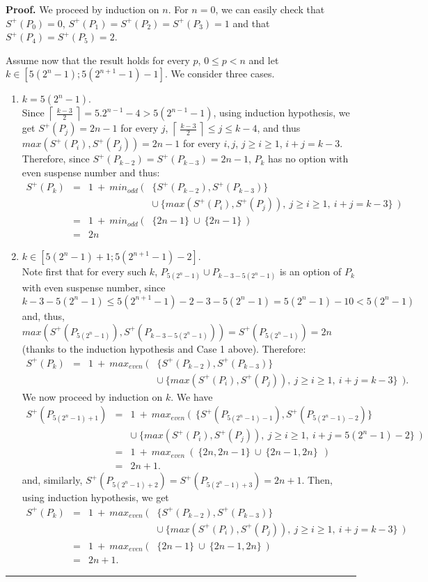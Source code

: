 \documentclass[11pt]{article}
\newcommand{\ceil}[1]{\left\lceil~#1~\right\rceil}
\newcommand\qed{\mbox{}\hfill\rule{0.5em}{0.809em}\par\vskip 5mm}
\newenvironment{proof}[0]{\noindent\textbf{Proof.}}{\qed}
\begin{document}
\begin{proof}
We proceed by induction on $n$.
For $n=0$, we can easily check that 
$S^+(P_0)=0$, $S^+(P_1)=S^+(P_2)=S^+(P_3)=1$ and that $S^+(P_4)=S^+(P_5)=2$.

Assume now that the result holds for every $p$, $0\le p<n$ and let
$k\in [5(2^n-1);5(2^{n+1}-1)-1]$. 
We consider three cases.

\begin{enumerate}
\item $k=5(2^n-1)$.\\
Since $\ceil{\frac{k-3}{2}}=5.2^{n-1}-4>5(2^{n-1}-1)$, 
using induction hypothesis, we get
$S^+(P_j)=2n-1$ for every $j$, $\ceil{\frac{k-3}{2}}\le j\le k-4$,
and thus $max(S^+(P_i),S^+(P_j))=2n-1$ for every $i,j$,
$j\ge i\ge 1$, $i+j=k-3$.
Therefore, since $S^+(P_{k-2})=S^+(P_{k-3})=2n-1$, $P_k$ has no option
with even suspense number and thus:
$$
\begin{array}{rcll}
S^+(P_k) & = & 1\ +\ min_{odd}\ ( & \{ S^+(P_{k-2}),S^+(P_{k-3})\} \\
  & & & \cup\ \{ max(S^+(P_i),S^+(P_j)),\ j\ge i\ge 1,\ i+j=k-3\}\ \ )\\
  & = & 1\ +\ min_{odd}\ ( & \{2n-1\}\
   \cup\ \{2n-1\}\ \ )\\
  & =& 2n
\end{array}
$$

\item $k\in [5(2^n-1)+1;5(2^{n+1}-1)-2]$.\\
Note first that for every such $k$,
$P_{5(2^n-1)}\cup P_{k-3-5(2^n-1)}$ is an option of $P_k$ with
even suspense number, since $k-3-5(2^n-1)\le 5(2^{n+1}-1)-2-3-5(2^n-1)
=5(2^n-1)-10<5(2^n-1)$ and, thus, 
$max(S^+(P_{5(2^n-1)}),S^+(P_{k-3-5(2^n-1)}))=S^+(P_{5(2^n-1)})=2n$
(thanks to the induction hypothesis and Case 1 above).
Therefore:
$$
\begin{array}{rcll}
S^+(P_k) & = & 1\ +\ max_{even}\ ( & \{ S^+(P_{k-2}),S^+(P_{k-3})\} \\
  & & & \cup\ \{ max(S^+(P_i),S^+(P_j)),\ j\ge i\ge 1,\ i+j=k-3\}\ \ ).
\end{array}
$$
We now proceed by induction on $k$.
We have
$$
\begin{array}{rcl}
S^+(P_{5(2^n-1)+1}) & = & 1\ +\ max_{even}\ (\ \ \{ S^+(P_{5(2^n-1)-1}),S^+(P_{5(2^n-1)-2})\} \\
  & &  \cup\ \{ max(S^+(P_i),S^+(P_j)),\ j\ge i\ge 1,\ i+j=5(2^n-1)-2\}\ \ )\\
  & = & 1\ +\ max_{even}\ (\ \{2n,2n-1\}\ \cup\ \{2n-1,2n\}\ \ )\\
  & = & 2n+1.
\end{array}
$$
and, similarly, $S^+(P_{5(2^n-1)+2})=S^+(P_{5(2^n-1)+3})=2n+1$.
Then, using induction hypothesis, we get
$$
\begin{array}{rcll}
S^+(P_{k}) & = & 1\ +\ max_{even}\ (& \{ S^+(P_{k-2}),S^+(P_{k-3})\} \\
  & & & \cup\ \{ max(S^+(P_i),S^+(P_j)),\ j\ge i\ge 1,\ i+j=k-3\}\ \ )\\
  & = & 1\ +\ max_{even}\ (& \{2n-1\}\ \cup\ \{2n-1,2n\}\ \ )\\
  & = & 2n+1.
\end{array}
$$


\end{enumerate}
\end{proof}
\end{document}
